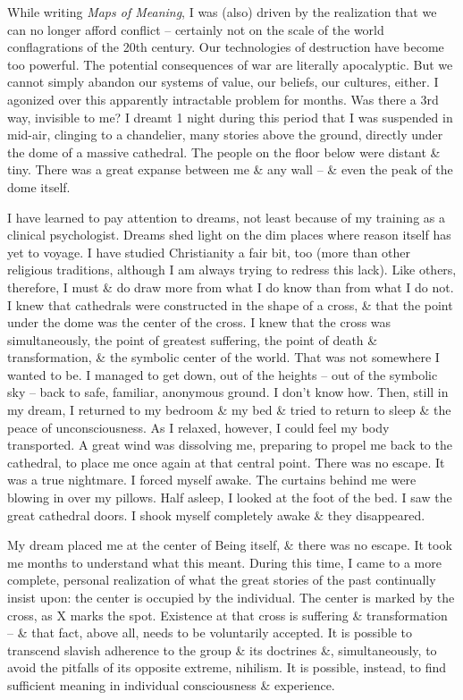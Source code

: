 \documentclass[oneside]{book}
\numberwithin{equation}{section}
\begin{document}
While writing \textit{Maps of Meaning}, I was (also) driven by the realization that we can no longer afford conflict -- certainly not on the scale of the world conflagrations of the 20th century. Our technologies of destruction have become too powerful. The potential consequences of war are literally apocalyptic. But we cannot simply abandon our systems of value, our beliefs, our cultures, either. I agonized over this apparently intractable problem for months. Was there a 3rd way, invisible to me? I dreamt 1 night during this period that I was suspended in mid-air, clinging to a chandelier, many stories above the ground, directly under the dome of a massive cathedral. The people on the floor below were distant \& tiny. There was a great expanse between me \& any wall -- \& even the peak of the dome itself.

I have learned to pay attention to dreams, not least because of my training as a clinical psychologist. Dreams shed light on the dim places where reason itself has yet to voyage. I have studied Christianity a fair bit, too (more than other religious traditions, although I am always trying to redress this lack). Like others, therefore, I must \& do draw more from what I do know than from what I do not. I knew that cathedrals were constructed in the shape of a cross, \& that the point under the dome was the center of the cross. I knew that the cross was simultaneously, the point of greatest suffering, the point of death \& transformation, \& the symbolic center of the world. That was not somewhere I wanted to be. I managed to get down, out of the heights -- out of the symbolic sky -- back to safe, familiar, anonymous ground. I don't know how. Then, still in my dream, I returned to my bedroom \& my bed \& tried to return to sleep \& the peace of unconsciousness. As I relaxed, however, I could feel my body transported. A great wind was dissolving me, preparing to propel me back to the cathedral, to place me once again at that central point. There was no escape. It was a true nightmare. I forced myself awake. The curtains behind me were blowing in over my pillows. Half asleep, I looked at the foot of the bed. I saw the great cathedral doors. I shook myself completely awake \& they disappeared.

My dream placed me at the center of Being itself, \& there was no escape. It took me months to understand what this meant. During this time, I came to a more complete, personal realization of what the great stories of the past continually insist upon: the center is occupied by the individual. The center is marked by the cross, as X marks the spot. Existence at that cross is suffering \& transformation -- \& that fact, above all, needs to be voluntarily accepted. It is possible to transcend slavish adherence to the group \& its doctrines \&, simultaneously, to avoid the pitfalls of its opposite extreme, nihilism. It is possible, instead, to find sufficient meaning in individual consciousness \& experience.
\end{document}

